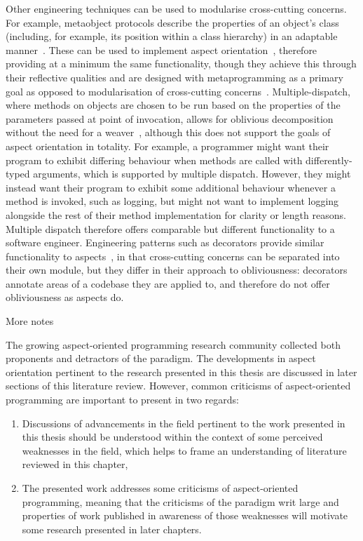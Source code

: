 Other engineering techniques can be used to modularise cross-cutting concerns.
For example, metaobject protocols describe the properties of an object's class
(including, for example, its position within a class hierarchy) in an adaptable
manner~\cite{kiczales1991art}. These can be used to implement aspect
orientation~\cite{espakaspect}, therefore providing at a minimum the same
functionality, though they achieve this through their reflective qualities and
are designed with metaprogramming as a primary goal as opposed to modularisation
of cross-cutting concerns~\cite{kiczales1991art,sullivan2001aspect}.
Multiple-dispatch, where methods on objects are chosen to be run based on the
properties of the parameters passed at point of invocation, allows for oblivious
decomposition without the need for a weaver~\cite{dozsa2008lisp}, although this
does not support the goals of aspect orientation in totality. For example, a
programmer might want their program to exhibit differing behaviour when methods
are called with differently-typed arguments, which is supported by multiple
dispatch. However, they might instead want their program to exhibit some
additional behaviour whenever a method is invoked, such as logging, but might
not want to implement logging alongside the rest of their method implementation
for clarity or length reasons. Multiple dispatch therefore offers comparable but
different functionality to a software engineer. Engineering patterns such as
decorators provide similar functionality to
aspects~\cite{friesel2017annotations}, in that cross-cutting concerns can be
separated into their own module, but they differ in their approach to
obliviousness: decorators annotate areas of a codebase they are applied to, and
therefore do not offer obliviousness as aspects do. 

More notes


The growing aspect-oriented programming research community collected both
proponents and detractors of the paradigm. The developments in
aspect orientation pertinent to the research presented in this thesis are
discussed in later sections of this literature review. However, common
criticisms of aspect-oriented programming are important to present in two
regards:

\begin{enumerate}
    \item Discussions of advancements in the field pertinent to the work
    presented in this thesis should be understood within the context of some
    perceived weaknesses in the field, which helps to frame an understanding of
    literature reviewed in this chapter,
    \item The presented work addresses some criticisms of aspect-oriented
    programming, meaning that the criticisms of the paradigm writ large and
    properties of work published in awareness of those weaknesses will motivate
    some research presented in later chapters.
\end{enumerate}

